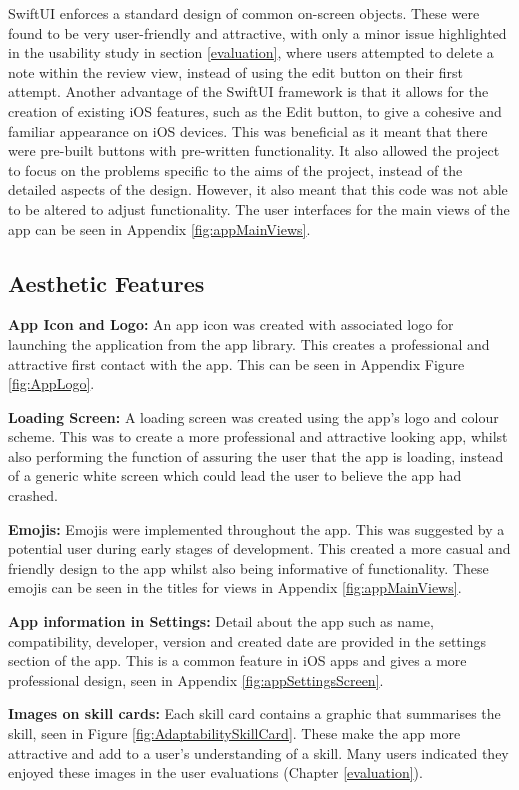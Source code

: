 \documentclass{l4proj}
\begin{document}
SwiftUI enforces a standard design of common on-screen objects. These were found to be very user-friendly and attractive, with only a minor issue highlighted in the usability study in section \ref{evaluation}, where users attempted to delete a note within the review view, instead of using the edit button on their first attempt. Another advantage of the SwiftUI framework is that it allows for the creation of existing iOS features, such as the Edit button, to give a cohesive and familiar appearance on iOS devices. This was beneficial as it meant that there were pre-built buttons with pre-written functionality. It also allowed the project to focus on the problems specific to the aims of the project, instead of the detailed aspects of the design. However, it also meant that this code was not able to be altered to adjust functionality. The user interfaces for the main views of the app can be seen in Appendix \ref{fig:appMainViews}.

\subsection{Aesthetic Features}

\textbf{App Icon and Logo:} An app icon was created with associated logo for launching the application from the app library. This creates a professional and attractive first contact with the app. This can be seen in Appendix Figure \ref{fig:AppLogo}.

\textbf{Loading Screen:} A loading screen was created using the app’s logo and colour scheme. This was to create a more professional and attractive looking app, whilst also performing the function of assuring the user that the app is loading, instead of a generic white screen which could lead the user to believe the app had crashed.

\textbf{Emojis:} Emojis were implemented throughout the app. This was suggested by a potential user during early stages of development. This created a more casual and friendly design to the app whilst also being informative of functionality. These emojis can be seen in the titles for views in Appendix \ref{fig:appMainViews}.

\textbf{App information in Settings:} Detail about the app such as name, compatibility, developer, version and created date are provided in the settings section of the app. This is a common feature in iOS apps and gives a more professional design, seen in Appendix \ref{fig:appSettingsScreen}.

\textbf{Images on skill cards:} Each skill card contains a graphic that summarises the skill, seen in Figure \ref{fig:AdaptabilitySkillCard}. These make the app more attractive and add to a user's understanding of a skill. Many users indicated they enjoyed these images in the user evaluations (Chapter \ref{evaluation}).
\end{document}
